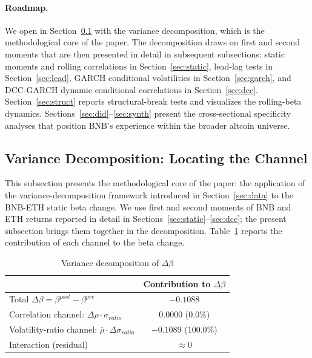 \documentclass[11pt,a4paper]{article}
\begin{document}
\paragraph{Roadmap.} We open in Section~\ref{sec:vd} with the variance decomposition, which is the methodological core of the paper. The decomposition draws on first and second moments that are then presented in detail in subsequent subsections: static moments and rolling correlations in Section~\ref{sec:static}, lead-lag tests in Section~\ref{sec:lead}, GARCH conditional volatilities in Section~\ref{sec:garch}, and DCC-GARCH dynamic conditional correlations in Section~\ref{sec:dcc}. Section~\ref{sec:struct} reports structural-break tests and visualizes the rolling-beta dynamics. Sections~\ref{sec:did}--\ref{sec:synth} present the cross-sectional specificity analyses that position BNB's experience within the broader altcoin universe.

\subsection{Variance Decomposition: Locating the Channel} \label{sec:vd}

This subsection presents the methodological core of the paper: the application of the variance-decomposition framework introduced in Section~\ref{sec:data} to the BNB-ETH static beta change. We use first and second moments of BNB and ETH returns reported in detail in Sections~\ref{sec:static}--\ref{sec:dcc}; the present subsection brings them together in the decomposition. Table~\ref{tab:vd} reports the contribution of each channel to the beta change.

\begin{table}[H]
\centering
\caption{Variance decomposition of $\Delta\beta$}
\label{tab:vd}
\begin{tabular}{lc}
\toprule
& \textbf{Contribution to $\Delta\beta$} \\
\midrule
Total $\Delta\beta = \beta^{post} - \beta^{pre}$ & $-0.1088$ \\
\midrule
Correlation channel: $\Delta\rho \cdot \overline{\sigma_{ratio}}$ & $0.0000$ ($0.0\%$) \\
Volatility-ratio channel: $\overline{\rho} \cdot \Delta\sigma_{ratio}$ & $-0.1089$ ($100.0\%$) \\
Interaction (residual) & $\approx 0$ \\
\bottomrule
\end{tabular}
\end{table}
\end{document}
